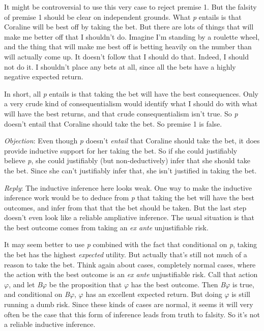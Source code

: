 \documentclass[
  11pt,
  letterpaper,
  DIV=11,
  numbers=noendperiod,
  twoside]{scrartcl}
\begin{document}
It might be controversial to use this very case to reject premise 1. But
the falsity of premise 1 should be clear on independent grounds. What
\emph{p} entails is that Coraline will be best off by taking the bet.
But there are lots of things that will make me better off that I
shouldn't do. Imagine I'm standing by a roulette wheel, and the thing
that will make me best off is betting heavily on the number than will
actually come up. It doesn't follow that I should do that. Indeed, I
should not do it. I shouldn't place any bets at all, since all the bets
have a highly negative expected return.

In short, all \emph{p} entails is that taking the bet will have the best
consequences. Only a very crude kind of consequentialism would identify
what I should do with what will have the best returns, and that crude
consequentialism isn't true. So \emph{p} doesn't entail that Coraline
should take the bet. So premise 1 is false.

\emph{Objection}: Even though \emph{p} doesn't \emph{entail} that
Coraline should take the bet, it does provide inductive support for her
taking the bet. So if she could justifiably believe \emph{p}, she could
justifiably (but non-deductively) infer that she should take the bet.
Since she can't justifiably infer that, she isn't justified in taking
the bet.

\emph{Reply}: The inductive inference here looks weak. One way to make
the inductive inference work would be to deduce from \emph{p} that
taking the bet will have the best outcomes, and infer from that that the
bet should be taken. But the last step doesn't even look like a reliable
ampliative inference. The usual situation is that the best outcome comes
from taking an \emph{ex ante} unjustifiable risk.

It may seem better to use \emph{p} combined with the fact that
conditional on \emph{p}, taking the bet has the highest \emph{expected}
utility. But actually that's still not much of a reason to take the bet.
Think again about cases, completely normal cases, where the action with
the best outcome is an \emph{ex ante} unjustifiable risk. Call that
action \(\varphi\), and let \emph{B}\(\varphi\) be the proposition that
\(\varphi\) has the best outcome. Then \emph{B}\(\varphi\) is true, and
conditional on \emph{B}\(\varphi\), \(\varphi\) has an excellent
expected return. But doing \(\varphi\) is still running a dumb risk.
Since these kinds of cases are normal, it seems it will very often be
the case that this form of inference leads from truth to falsity. So
it's not a reliable inductive inference.
\end{document}
